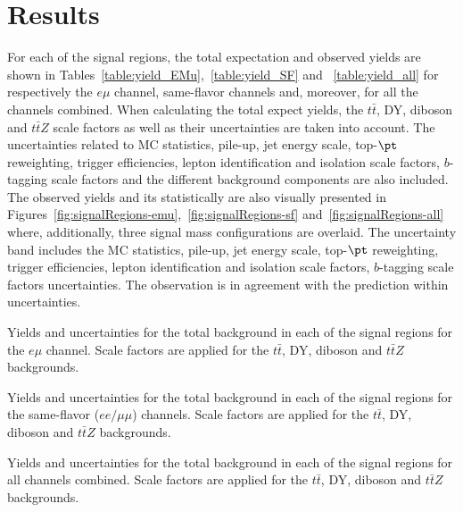 \section{Results}

  For each of the signal regions, the total expectation  and observed yields are shown in Tables~\ref{table:yield_EMu},~\ref{table:yield_SF} and ~\ref{table:yield_all} for respectively the $e\mu$ channel, same-flavor channels
  and, moreover, for all the channels combined. When calculating the total expect yields, the $t\bar{t}$, DY, diboson and $t\bar{t}Z$ scale factors as well as their uncertainties are taken into account. 
  The uncertainties related to MC statistics, pile-up, jet energy scale, top-$\pt$ reweighting, trigger efficiencies, lepton identification and isolation scale factors, $b$-tagging scale factors
  and the different background components are also included.
  The observed yields and its statistically are also visually presented in Figures~\ref{fig:signalRegions-emu},~\ref{fig:signalRegions-sf} and~\ref{fig:signalRegions-all} where, additionally, three
  signal mass configurations are overlaid. The uncertainty band includes the MC statistics, pile-up, jet energy scale, top-$\pt$ reweighting, trigger efficiencies, lepton identification and isolation scale factors, $b$-tagging scale factors
  uncertainties.
  The observation is in agreement with the prediction within uncertainties.

  \begin{table}
    \centering
    \setlength{\tabcolsep}{4pt}
    \footnotesize
    
    \caption{Yields and uncertainties for the total background in each of the signal regions for the $e\mu$ channel. Scale factors are applied for the $t\bar{t}$, DY, diboson and $t\bar{t}Z$ backgrounds.}
    \label{table:yield_EMu}
  \end{table}

  \begin{table}
    \centering
    \footnotesize
    \setlength{\tabcolsep}{4pt}
    
    \caption{Yields and uncertainties for the total background in each of the signal regions for the same-flavor ($ee/\mu\mu$) channels. Scale factors are applied for the $t\bar{t}$, DY, diboson and $t\bar{t}Z$ backgrounds.}
    \label{table:yield_SF}
  \end{table}
 
  \begin{table}
    \centering
    \footnotesize
    \setlength{\tabcolsep}{4pt}
    
    \caption{Yields and uncertainties for the total background in each of the signal regions for all channels combined. Scale factors are applied for the $t\bar{t}$, DY, diboson and $t\bar{t}Z$ backgrounds.}
    \label{table:yield_all}
  \end{table}


